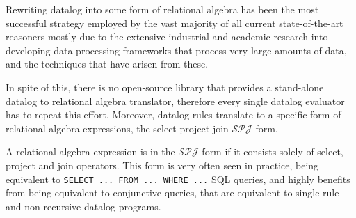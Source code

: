 \documentclass[manuscript,screen,review]{acmart}
\theoremstyle{definition}
\begin{document}
Rewriting datalog into some form of relational algebra has been the most successful strategy employed by the vast majority of all current state-of-the-art
reasoners\cite{bigdatalog, cog, nexus, recstep, dcdatalog, souffle} mostly due to the extensive industrial and academic research into developing data processing frameworks that
process very large amounts of data, and the techniques that have arisen from these.

In spite of this, there is no open-source library that provides a stand-alone datalog to relational algebra translator, therefore every single
datalog evaluator has to repeat this effort. Moreover, datalog rules translate to a specific form of relational algebra expressions, the
select-project-join $\mathcal{SPJ}$ form.

A relational algebra expression is in the $\mathcal{SPJ}$ form if it consists solely of select, project and join operators. This form
is very often seen in practice, being equivalent to \verb|SELECT ... FROM ... WHERE ...| SQL queries, and highly benefits from being
equivalent to conjunctive queries, that are equivalent to single-rule and non-recursive datalog programs.
\end{document}

